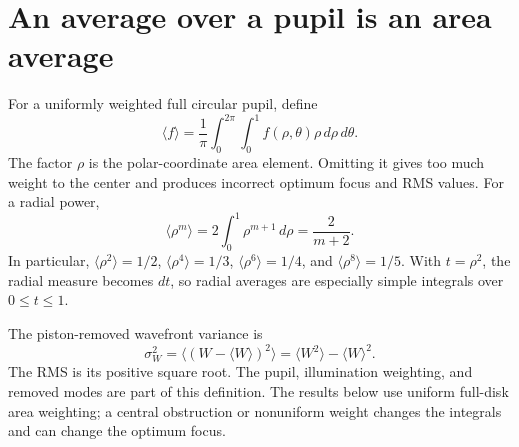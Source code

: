\section{An average over a pupil is an area average}
For a uniformly weighted full circular pupil, define
\begin{equation}
 \langle f\rangle=\frac1\pi\int_0^{2\pi}\int_0^1
        f(\rho,\theta)\rho\,d\rho\,d\theta.
 \label{ab:average}
\end{equation}
The factor $\rho$ is the polar-coordinate area element. Omitting it gives too
much weight to the center and produces incorrect optimum focus and RMS
values. For a radial power,
\begin{equation}
 \langle\rho^m\rangle=2\int_0^1\rho^{m+1}\,d\rho
          =\frac{2}{m+2}.
\end{equation}
In particular, $\langle\rho^2\rangle=1/2$,
$\langle\rho^4\rangle=1/3$, $\langle\rho^6\rangle=1/4$, and
$\langle\rho^8\rangle=1/5$. With $t=\rho^2$, the radial measure becomes
$dt$, so radial averages are especially simple integrals over $0\leq t\leq1$.

The piston-removed wavefront variance is
\begin{equation}
 \sigma_W^2=\langle(W-\langle W\rangle)^2\rangle
        =\langle W^2\rangle-\langle W\rangle^2.
\end{equation}
The RMS is its positive square root. The pupil, illumination weighting, and
removed modes are part of this definition. The results below use uniform
full-disk area weighting; a central obstruction or nonuniform weight changes
the integrals and can change the optimum focus.

